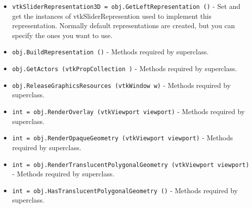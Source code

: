 \begin{itemize}
\item  \verb|vtkSliderRepresentation3D = obj.GetLeftRepresentation ()| -  Set and get the instances of vtkSliderRepresention used to implement this
 representation. Normally default representations are created, but you can
 specify the ones you want to use.

\item  \verb|obj.BuildRepresentation ()| -  Methods required by superclass.

\item  \verb|obj.GetActors (vtkPropCollection )| -  Methods required by superclass.

\item  \verb|obj.ReleaseGraphicsResources (vtkWindow w)| -  Methods required by superclass.

\item  \verb|int = obj.RenderOverlay (vtkViewport viewport)| -  Methods required by superclass.

\item  \verb|int = obj.RenderOpaqueGeometry (vtkViewport viewport)| -  Methods required by superclass.

\item  \verb|int = obj.RenderTranslucentPolygonalGeometry (vtkViewport viewport)| -  Methods required by superclass.

\item  \verb|int = obj.HasTranslucentPolygonalGeometry ()| -  Methods required by superclass.

\end{itemize}
